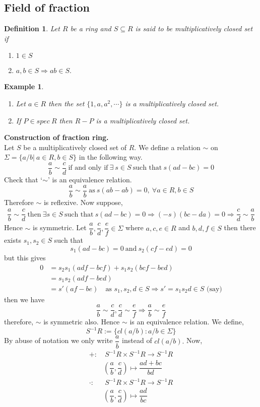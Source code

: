 \documentclass[11pt]{amsart}
\newtheorem{defn}[theorem]{Definition}
\newtheorem{eg}[theorem]{Example}
\begin{document}
\subsection{Field of fraction}
\begin{defn}
Let $R$ be a ring and $S\subseteq R$ is said to be multiplicatively closed set if
\begin{enumerate}
\item[(i)] $1\in S$
\item[(ii)] $a,b\in S\Rightarrow ab\in S.$
\end{enumerate}
\end{defn}
\begin{eg}
\begin{enumerate}
\item Let $a\in R$ then the set $\{1,a,a^2,\cdots \}$ is a multiplicatively closed set.
\item If $P\in spec~R$ then $R-P$ is a multiplicatively closed set.
\end{enumerate}
\end{eg}
\textbf{Construction of fraction ring.}\\
Let $S$ be a multiplicatively closed set of $R.$ We define a relation $\sim$ on $\Sigma=\{a/b|~a\in R,b\in S\}$ in the following way. $$\dfrac{a}{b}\sim \dfrac{c}{d} ~\text{if and only if}~\exists~ s\in S~\text{such that}~s(ad-bc)=0$$ 
Check that `$\sim$' is an equivalence relation. $$\dfrac{a}{b}\sim \dfrac{a}{b} ~\text{as}~s(ab-ab)=0,~\forall a\in R,b\in S$$
Therefore $\sim$ is reflexive. Now suppose, \begin{align*}
\dfrac{a}{b} \sim \dfrac{c}{d}~\text{then}~\exists s\in S~\text{such that}~s(ad-bc)=0\Rightarrow (-s)(bc-da)=0 \Rightarrow \dfrac{c}{d}\sim \dfrac{a}{b}
\end{align*}
Hence $\sim$ is symmetric. Let $\dfrac{a}{b},\dfrac{c}{d},\dfrac{e}{f}\in \Sigma$ where $a,c,e\in R$ and $b,d,f\in S$ then there exists $s_1,s_2\in S$ such that $$s_1(ad-bc)=0~\text{and}~s_2(cf-ed)=0$$ but this gives \begin{align*}
0&=s_2s_1(adf-bcf)+s_1s_2(bcf-bed)\\
&=s_1s_2(adf-bed)\\
&=s'(af-be)\quad \text{as $s_1,s_2,d\in S \Rightarrow s'=s_1s_2d\in S$ (say)}
\end{align*}
then we have $$\dfrac{a}{b}\sim \dfrac{c}{d},\dfrac{c}{d}\sim \dfrac{e}{f} \Rightarrow \dfrac{a}{b}\sim \dfrac{e}{f}$$ therefore, $\sim$ is symmetric also. Hence $\sim$ is an equivalence relation. We define, $$S^{-1}R:=\{cl(a/b):a/b\in \Sigma\}$$ By abuse of notation we only write $\dfrac{a}{b}$ instead of $cl(a/b).$ Now, \begin{align*}
+:&~S^{-1}R\times S^{-1}R\to S^{-1}R\\
 &\left(\dfrac{a}{b},\dfrac{c}{d}\right)\mapsto \dfrac{ad+bc}{bd}\\
\cdot:&~S^{-1}R\times S^{-1}R\to S^{-1}R\\
 &\left(\dfrac{a}{b},\dfrac{c}{d}\right)\mapsto \dfrac{ad}{bc}
\end{align*}
\end{document}
